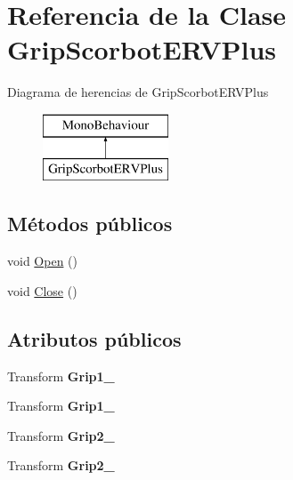\hypertarget{class_grip_scorbot_e_r_v_plus}{}\section{Referencia de la Clase Grip\+Scorbot\+E\+R\+V\+Plus}
\label{class_grip_scorbot_e_r_v_plus}
Diagrama de herencias de Grip\+Scorbot\+E\+R\+V\+Plus\begin{figure}[H]
\begin{center}
\leavevmode
\includegraphics[height=2.000000cm]{class_grip_scorbot_e_r_v_plus}
\end{center}
\end{figure}
\subsection*{Métodos públicos}
\begin{DoxyCompactItemize}
\item 
void \mbox{\hyperlink{class_grip_scorbot_e_r_v_plus_a5e70a5bedcd58c5ac70c616741294f71}{Open}} ()
\item 
void \mbox{\hyperlink{class_grip_scorbot_e_r_v_plus_a40aaa4460e903237491daff0cd9e688e}{Close}} ()
\end{DoxyCompactItemize}
\subsection*{Atributos públicos}
\begin{DoxyCompactItemize}
\item 
\mbox{\label{class_grip_scorbot_e_r_v_plus_ab31ea6a499f9a36641fac3fa0f5c05d6}} 
Transform {\bfseries Grip1\+\_}
\item 
\mbox{\label{class_grip_scorbot_e_r_v_plus_a1466e6fd53069eb771ac481cc9debb53}} 
Transform {\bfseries Grip1\+\_}
\item 
\mbox{\label{class_grip_scorbot_e_r_v_plus_a15d2e9637045dbaa80c8a5614a38cd0b}} 
Transform {\bfseries Grip2\+\_}
\item 
\mbox{\label{class_grip_scorbot_e_r_v_plus_a4680d2c8e108da09278319c8c0887e4a}} 
Transform {\bfseries Grip2\+\_}
\end{DoxyCompactItemize}
